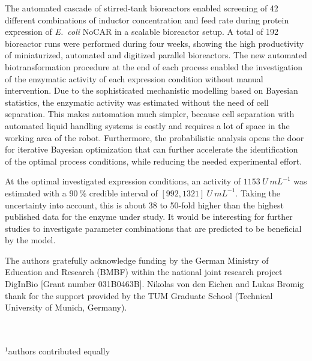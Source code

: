 \documentclass[sn-standardnature]{sn-jnl}%
\theoremstyle{thmstyleone}%
\theoremstyle{thmstyletwo}%
\theoremstyle{thmstylethree}%
\begin{document}
The automated cascade of stirred-tank bioreactors enabled screening of 42 different combinations of inductor concentration and feed rate during protein expression of \textit{E.~coli} NoCAR in a scalable bioreactor setup.
A total of 192 bioreactor runs were performed during four weeks, showing the high productivity of miniaturized, automated and digitized parallel bioreactors.
The new automated biotransformation procedure at the end of each process enabled the investigation of the enzymatic activity of each expression condition without manual intervention.
Due to the sophisticated mechanistic modelling based on Bayesian statistics, the enzymatic activity was estimated without the need of cell separation.
This makes automation much simpler, because cell separation with automated liquid handling systems is costly and requires a lot of space in the working area of the robot.
Furthermore, the probabilistic analysis opens the door for iterative Bayesian optimization that can further accelerate the identification of the optimal process conditions, while reducing the needed experimental effort.

At the optimal investigated expression conditions, an activity of $1153\ U\ mL^{-1}$ was estimated with a $90\ \%$ credible interval of $[992, 1321]\ U\ mL^{-1}$.
Taking the uncertainty into account, this is about 38 to 50-fold higher than the highest published data for the enzyme under study.
It would be interesting for further studies to investigate parameter combinations that are predicted to be beneficial by the model.

\backmatter
{}
The authors gratefully acknowledge funding by the German Ministry of Education and Research (BMBF) within the national joint research project DigInBio [Grant number 031B0463B].
Nikolas von den Eichen and Lukas Bromig thank for the support provided by the TUM Graduate School (Technical University of Munich, Germany).





\mbox{}\\
\mbox{}\\
$^1$authors contributed equally
\end{document}
